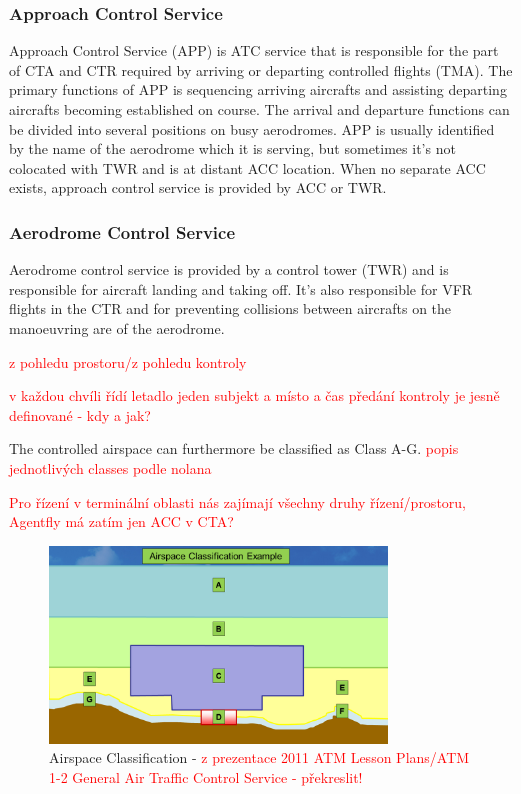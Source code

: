 \subsubsection{Approach Control Service}
Approach Control Service (APP) is ATC service that is responsible for the part of CTA and CTR required by arriving or departing controlled flights (TMA). The primary functions of APP is sequencing arriving aircrafts and assisting departing aircrafts becoming established on course. The arrival and departure functions can be divided into several positions on busy aerodromes. APP is usually identified by the name of the aerodrome which it is serving, but sometimes it's not colocated with TWR and is at distant ACC location. When no separate ACC exists, approach control service is provided by ACC or TWR. \cite[Chapter 3.2]{annex11}

\subsubsection{Aerodrome Control Service}
Aerodrome control service is provided by a control tower (TWR) and is responsible for aircraft landing and taking off. It's also responsible for VFR flights in the CTR and for preventing collisions between aircrafts on the manoeuvring are of the aerodrome. \cite[Chapter 3.2]{annex11}

\textcolor{red}{z pohledu prostoru/z pohledu kontroly}

\textcolor{red}{v každou chvíli řídí letadlo jeden subjekt a místo a čas předání kontroly je jesně definované - kdy a jak?}

The controlled airspace can furthermore be classified as Class A-G. \cite[\textcolor{red}{kapitola}]{nolan} \textcolor{red}{popis jednotlivých classes podle nolana}

\textcolor{red}{Pro řízení v terminální oblasti nás zajímají všechny druhy řízení/prostoru, Agentfly má zatím jen ACC v CTA?}

\begin{figure}[h]
    \centering
    \includegraphics[width=0.8\textwidth]{figures/classes.png}
    \caption{Airspace Classification - \textcolor{red}{z prezentace 2011 ATM Lesson Plans/ATM 1-2 General Air Traffic Control Service \cite {nolan} - překreslit!}}
    \label{fig:classes}
\end{figure}

